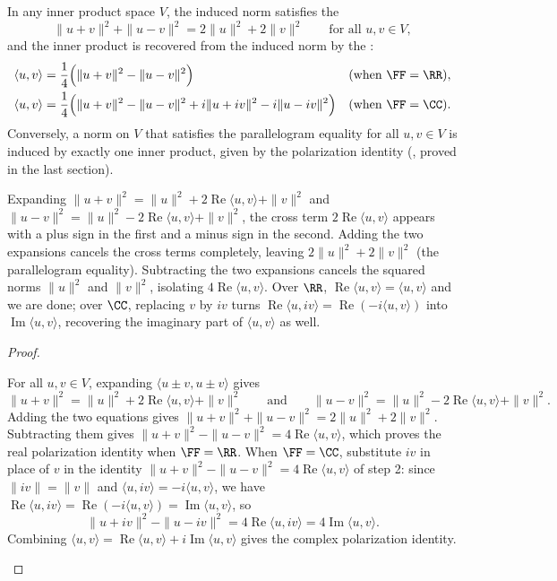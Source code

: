 \documentclass[10pt]{scrartcl}
\newcommand{\ip}[2]{\langle #1,#2\rangle}
\begin{document}
\begin{proposition*}
  In any inner product space $V$, the induced norm satisfies the 
  \[
    \|u+v\|^2 + \|u-v\|^2 = 2\|u\|^2 + 2\|v\|^2 \qquad\text{for all }u,v\in V,
  \]
  and the inner product is recovered from the induced norm by the :
  \begin{align*}
    \ip uv &= \frac{1}{4}\Big(\|u+v\|^2 - \|u-v\|^2\Big) && (\text{when }\FF=\RR), \\
    \ip uv &= \frac{1}{4}\Big(\|u+v\|^2 - \|u-v\|^2 + i\|u+iv\|^2 - i\|u-iv\|^2\Big) && (\text{when }\FF=\CC).
  \end{align*}
  Conversely, a norm on $V$ that satisfies the parallelogram equality for all $u,v\in V$ is induced by exactly one inner product, given by the polarization identity (, proved in the last section).
\end{proposition*}
\begin{ideabox}
  Expanding $\|u+v\|^2=\|u\|^2+2\operatorname{Re}\ip uv+\|v\|^2$ and $\|u-v\|^2=\|u\|^2-2\operatorname{Re}\ip uv+\|v\|^2$, the cross term $2\operatorname{Re}\ip uv$ appears with a plus sign in the first and a minus sign in the second. Adding the two expansions cancels the cross terms completely, leaving $2\|u\|^2+2\|v\|^2$ (the parallelogram equality). Subtracting the two expansions cancels the squared norms $\|u\|^2$ and $\|v\|^2$, isolating $4\operatorname{Re}\ip uv$. Over $\RR$, $\operatorname{Re}\ip uv=\ip uv$ and we are done; over $\CC$, replacing $v$ by $iv$ turns $\operatorname{Re}\ip u{iv}=\operatorname{Re}(-i\ip uv)$ into $\operatorname{Im}\ip uv$, recovering the imaginary part of $\ip uv$ as well.
\end{ideabox}
\begin{proof}
  \begin{steps}
    \ii For all $u,v\in V$, expanding $\ip{u\pm v}{u\pm v}$ gives
    \[
      \|u+v\|^2 = \|u\|^2 + 2\operatorname{Re}\ip uv + \|v\|^2 \qquad\text{and}\qquad \|u-v\|^2 = \|u\|^2 - 2\operatorname{Re}\ip uv + \|v\|^2.
    \]
    \ii Adding the two equations gives $\|u+v\|^2+\|u-v\|^2=2\|u\|^2+2\|v\|^2$. Subtracting them gives $\|u+v\|^2-\|u-v\|^2=4\operatorname{Re}\ip uv$, which proves the real polarization identity when $\FF=\RR$.
    \ii When $\FF=\CC$, substitute $iv$ in place of $v$ in the identity $\|u+v\|^2-\|u-v\|^2=4\operatorname{Re}\ip uv$ of step 2: since $\|iv\|=\|v\|$ and $\ip u{iv}=-i\ip uv$, we have $\operatorname{Re}\ip u{iv}=\operatorname{Re}(-i\ip uv)=\operatorname{Im}\ip uv$, so
    \[
      \|u+iv\|^2 - \|u-iv\|^2 = 4\operatorname{Re}\ip u{iv} = 4\operatorname{Im}\ip uv.
    \]
    Combining $\ip uv = \operatorname{Re}\ip uv + i\operatorname{Im}\ip uv$ gives the complex polarization identity.
  \end{steps}
\end{proof}
\end{document}
